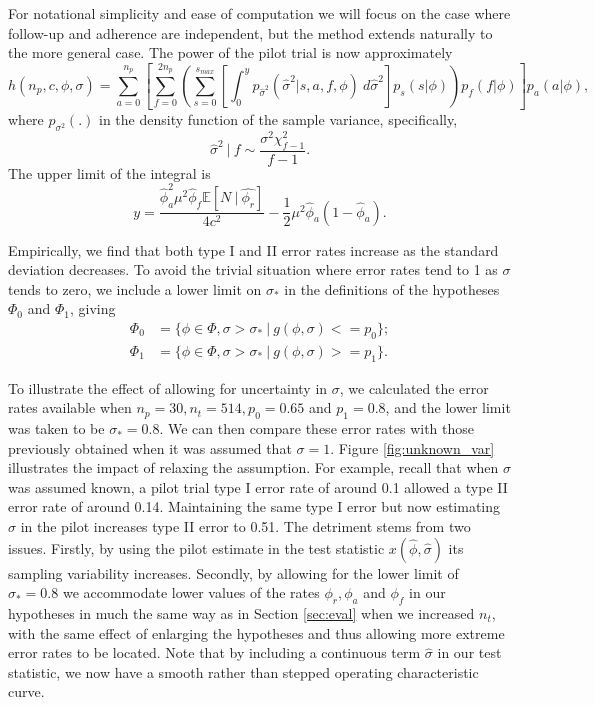\documentclass[AMA,STIX1COL]{WileyNJD-v2}
\begin{document}
For notational simplicity and ease of computation we will focus on the case where follow-up and adherence are independent, but the method extends naturally to the more general case. The power of the pilot trial is now approximately 
\begin{equation*}
h(n_p, c, \phi, \sigma) = \sum_{a=0}^{n_p} \left[  \sum_{f=0}^{2n_p} \left( \sum_{s = 0}^{s_{max}} 
\left[ \int_0^y p_{\hat{\sigma}^2}( \hat{\sigma}^2 | s, a, f, \phi) ~ d\hat{\sigma}^2 \right] 
p_s(s | \phi) \right) p_{f}(f |\phi)  \right] p_a(a | \phi),
\end{equation*}
where $p_{\sigma^2}(.)$ in the density function of the sample variance, specifically,
$$
\hat{\sigma}^2 ~|~  f \sim \frac{\sigma^2 \chi^2_{f - 1}}{f - 1}.
$$
The upper limit of the integral is
$$
y = \frac{\hat{\phi}_a^2 \mu^2 \hat{\phi}_f \mathbb{E}[N ~|~ \hat{\phi_r}]}{4c^2} - \frac{1}{2} \mu^2 \hat{\phi}_a (1-\hat{\phi}_a).
$$

Empirically, we find that both type I and II error rates increase as the standard deviation decreases. To avoid the trivial situation where error rates tend to 1 as $\sigma$ tends to zero, we include a lower limit on $\sigma_*$ in the definitions of the hypotheses $\Phi_0$ and $\Phi_1$, giving
\begin{align*}
\Phi_0 &= \{\phi \in \Phi, \sigma > \sigma_*  ~ | ~ g(\phi, \sigma) <= p_0 \}; \\
\Phi_1 &= \{\phi \in \Phi, \sigma > \sigma_* ~ | ~ g(\phi, \sigma) >= p_1 \}.
\end{align*}

To illustrate the effect of allowing for uncertainty in $\sigma$, we calculated the error rates available when $n_p = 30, n_t = 514, p_0 = 0.65$ and $p_1 = 0.8$, and the lower limit was taken to be $\sigma_* = 0.8$. We can then compare these error rates with those previously obtained when it was assumed that $\sigma = 1$. Figure \ref{fig:unknown_var} illustrates the impact of relaxing the assumption. For example, recall that when $\sigma$ was assumed known, a pilot trial type I error rate of around 0.1 allowed a type II error rate of around 0.14. Maintaining the same type I error but now estimating $\sigma$ in the pilot increases type II error to 0.51. The detriment stems from two issues. Firstly, by using the pilot estimate in the test statistic $x(\hat{\phi}, \hat{\sigma})$ its sampling variability increases. Secondly, by allowing for the lower limit of $\sigma_* = 0.8$ we accommodate lower values of the rates $\phi_r, \phi_a$ and $\phi_f$ in our hypotheses in much the same way as in Section \ref{sec:eval} when we increased $n_t$, with the same effect of enlarging the hypotheses and thus allowing more extreme error rates to be located. Note that by including a continuous term $\hat{\sigma}$ in our test statistic, we now have a smooth rather than stepped operating characteristic curve.
\end{document}
